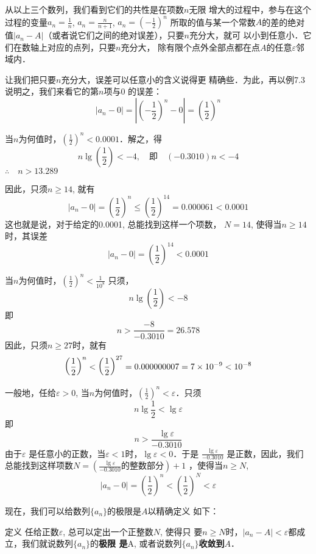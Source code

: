 从以上三个数列，我们看到它们的共性是在项数$n$无限
增大的过程中，参与在这个过程的变量$a_n=\frac{1}{n}$, $a_n=\frac{n}{n+1}$, 
$a_n=\left(-\frac{1}{2}\right)^n$
所取的值与某一个常数$A$的差的绝对值$|a_n-
A|$（或者说它们之间的绝对误差），只要$n$充分大，就可
以小到任意小．它们在数轴上对应的点列，只要$n$充分大，
除有限个点外全部点都在点$A$的任意$\varepsilon$邻域内．

让我们把只要$n$充分大，误差可以任意小的含义说得更
精确些．为此，再以例7.3说明之，我们来看它的第$n$项与0
的误差：
\[|a_n-0|=\left|\left(-\frac{1}{2}\right)^n-0\right|=\left(\frac{1}{2}\right)^n\]

当$n$为何值时，$\left(\frac{1}{2}\right)^n<0.0001$．解之，得
\[n\lg\left(\frac{1}{2}\right)<-4,\quad \text{即}\quad (-0.3010)n<-4\]
$\therefore\quad n>13.289$

因此，只须$n\ge 14$, 就有
\[|a_n-0|=\left(\frac{1}{2}\right)^n\le \left(\frac{1}{2}\right)^{14}=0.000061<0.0001\]
这也就是说，对于给定的0.0001, 总能找到这样一个项数，
$N=14$, 使得当$n\ge14$时，其误差
\[|a_n-0|=\left(\frac{1}{2}\right)^{14}<0.0001\]

当$n$为何值时，$\left(\frac{1}{2}\right)^n<\frac{1}{10^8}$
只须，
\[n\lg\left(\frac{1}{2}\right)<-8\]
即
\[n>\frac{-8}{-0.3010}=26.578\]
因此，只须$n\ge 27$时，就有
\[\left(\dfrac{1}{2}\right)^n<\left(\dfrac{1}{2}\right)^{27}=0.000000007=7\times 10^{-9}<10^{-8}\]

一般地，任给$\varepsilon >0$, 当$n$为何值时，$\left(\frac{1}{2}\right)^n<\varepsilon$．只须
\[n\lg \frac{1}{2}<\lg\varepsilon\] 
即
\[n>\frac{\lg\varepsilon}{-0.3010}\]
由于$\varepsilon$ 是任意小的正数，当$\varepsilon <1$时，$\lg\varepsilon <0$．于是
$\frac{\lg\varepsilon}{-0.3010}$
是正数，因此，我们总能找到这样项数$N=\left(\frac{\lg\varepsilon}{-0.3010}\text{的整数部分}\right)+1$
，使得当$n\ge N$,
\[|a_n-0|=\left(\frac{1}{2}\right)^n<\left(\frac{1}{2}\right)^N<\varepsilon  \]

现在，我们可以给数列$\{a_n\}$的极限是$A$以精确定义
如下：

\begin{blk}{定义}
    任给正数$\varepsilon$, 总可以定出一个正整数$N$, 使得只
要$n\ge N$时，$|a_n-A|<\varepsilon$都成立，我们就说数列$\{a_n\}$的\textbf{极限
是}A, 或者说数列$\{a_n\}$\textbf{收敛到}$A$．
\end{blk}
 
